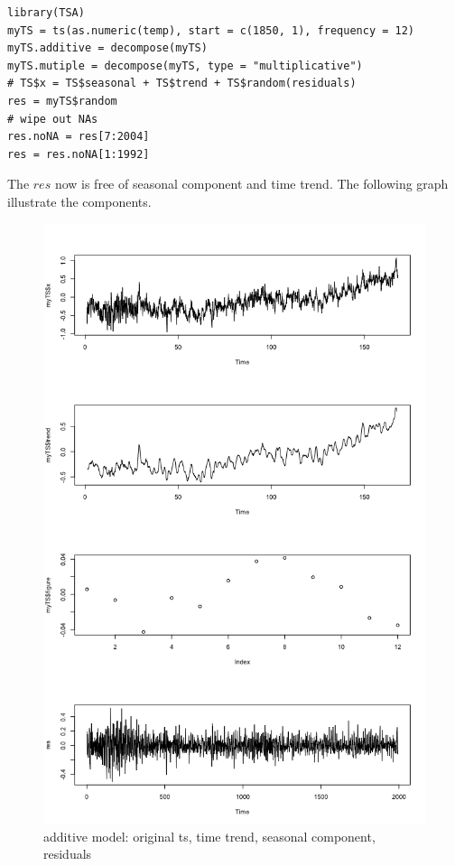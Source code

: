 \documentclass[a4paper, 11pt]{article}
\begin{document}
\begin{verbatim}
library(TSA)
myTS = ts(as.numeric(temp), start = c(1850, 1), frequency = 12)
myTS.additive = decompose(myTS)
myTS.mutiple = decompose(myTS, type = "multiplicative")
# TS$x = TS$seasonal + TS$trend + TS$random(residuals) 
res = myTS$random
# wipe out NAs
res.noNA = res[7:2004] 
res = res.noNA[1:1992]
\end{verbatim}
\indent The $res$ now is free of seasonal component and time trend. The following graph illustrate the components.
\begin{figure}[H]
\centering
\caption{additive model: original ts, time trend, seasonal component, residuals}
\includegraphics[scale=.50]{component.png}
\end{figure}
\end{document}
